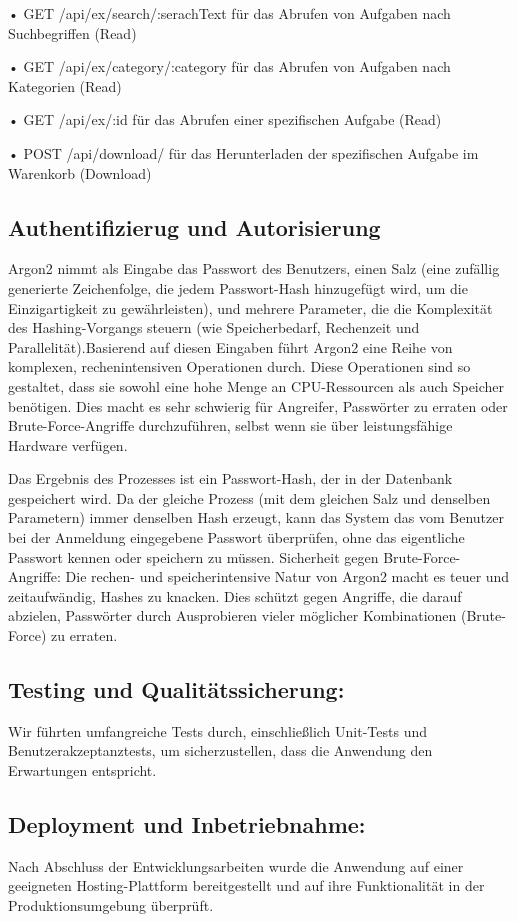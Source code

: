 •	GET /api/ex/search/:serachText	für das Abrufen von Aufgaben nach Suchbegriffen (Read)

•	GET /api/ex/category/:category	für das Abrufen von Aufgaben nach Kategorien (Read)

•	GET /api/ex/:id	für das Abrufen einer spezifischen Aufgabe (Read)

•	POST /api/download/ 	für das Herunterladen der spezifischen Aufgabe im Warenkorb (Download)



\subsection{Authentifizierug und Autorisierung}
Argon2 nimmt als Eingabe das Passwort des Benutzers, einen Salz (eine zufällig generierte Zeichenfolge, die jedem Passwort-Hash hinzugefügt wird, um die Einzigartigkeit zu gewährleisten), und mehrere Parameter, die die Komplexität des Hashing-Vorgangs steuern (wie Speicherbedarf, Rechenzeit und Parallelität).Basierend auf diesen Eingaben führt Argon2 eine Reihe von komplexen, rechenintensiven Operationen durch. Diese Operationen sind so gestaltet, dass sie sowohl eine hohe Menge an CPU-Ressourcen als auch Speicher benötigen. Dies macht es sehr schwierig für Angreifer, Passwörter zu erraten oder Brute-Force-Angriffe durchzuführen, selbst wenn sie über leistungsfähige Hardware verfügen.

Das Ergebnis des Prozesses ist ein Passwort-Hash, der in der Datenbank gespeichert wird. Da der gleiche Prozess (mit dem gleichen Salz und denselben Parametern) immer denselben Hash erzeugt, kann das System das vom Benutzer bei der Anmeldung eingegebene Passwort überprüfen, ohne das eigentliche Passwort kennen oder speichern zu müssen. Sicherheit gegen Brute-Force-Angriffe: Die rechen- und speicherintensive Natur von Argon2 macht es teuer und zeitaufwändig, Hashes zu knacken. Dies schützt gegen Angriffe, die darauf abzielen, Passwörter durch Ausprobieren vieler möglicher Kombinationen (Brute-Force) zu erraten.

\subsection{Testing und Qualitätssicherung: }
Wir führten umfangreiche Tests durch, einschließlich Unit-Tests und Benutzerakzeptanztests, um sicherzustellen, dass die Anwendung den Erwartungen entspricht.


\subsection{Deployment und Inbetriebnahme: }
Nach Abschluss der Entwicklungsarbeiten wurde die Anwendung auf einer geeigneten Hosting-Plattform bereitgestellt und auf ihre Funktionalität in der Produktionsumgebung überprüft.


